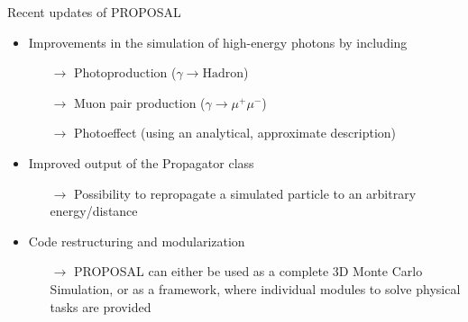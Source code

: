 \documentclass[t]{beamer}
\newlength{\itemseparation}
\begin{document}
\begin{columns}[onlytextwidth]
\begin{column}{0.4\textwidth}
\begin{block}[equal height group=F]{Recent updates of PROPOSAL}
\begin{figure}
\begin{tikzpicture}[scale=2.5, every node/.style={scale=1.0}]
            \end{tikzpicture}
        \end{figure} 
        \begin{itemize}
          \setlength\itemsep{\itemseparation}
          \item Improvements in the simulation of high-energy photons by including
          \begin{itemize}
            \setlength\itemsep{\itemseparation}
            \item[$\rightarrow$] Photoproduction ($\gamma \rightarrow \text{Hadron}$)
            \item[$\rightarrow$] Muon pair production ($\gamma \rightarrow \mu^+ \mu^-$)
            \item[$\rightarrow$] Photoeffect (using an analytical, approximate description)
          \end{itemize}
          \item Improved output of the Propagator class
          \begin{itemize}
            \setlength\itemsep{\itemseparation}
            \item[$\rightarrow$] Possibility to repropagate a simulated particle to an arbitrary energy/distance
          \end{itemize}
          \item Code restructuring and modularization
          \begin{itemize}
            \setlength\itemsep{\itemseparation}
            \item[$\rightarrow$] PROPOSAL can either be used as a complete 3D Monte Carlo Simulation, or as a framework, where individual modules to solve physical tasks are provided
          \end{itemize}
        \end{itemize}
      \end{block}%
    \end{column}%
  \end{columns}%
\end{document}
